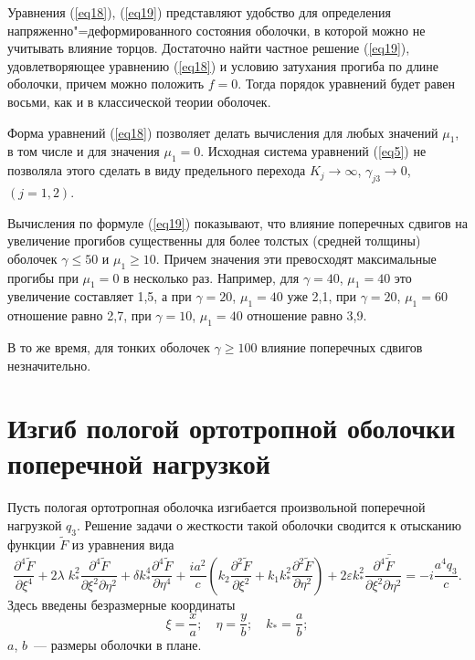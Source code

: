 \documentclass[press]{vestnik}
\begin{document}
Уравнения (\ref{eq18}), (\ref{eq19}) представляют удобство для определения 
напряженно"=деформированного состояния оболочки, в которой можно не учитывать 
влияние торцов. Достаточно найти частное решение (\ref{eq19}), удовлетворяющее 
уравнению (\ref{eq18}) и условию затухания прогиба по длине оболочки, причем можно 
положить $f=0$. Тогда порядок уравнений будет равен восьми, как и в 
классической теории оболочек.

Форма уравнений (\ref{eq18}) позволяет делать вычисления для любых значений $\mu 
_{1} $, в том числе и для значения $\mu_{1} =0$. Исходная система уравнений 
(\ref{eq5}) не позволяла этого сделать в виду предельного перехода $K_{j} \to 
\infty $, $\gamma_{j3} \to 0$, $\left( {j=1, 2} \right)$.

Вычисления по формуле (\ref{eq19}) показывают, что влияние поперечных сдвигов на 
увеличение прогибов существенны для более толстых (средней толщины) оболочек 
$\gamma \leqslant 50$ и $\mu_{1} \geqslant 10$. Причем значения эти превосходят 
максимальные прогибы при $\mu_{1} =0$ в несколько раз. Например, для 
$\gamma =40$, $\mu_{1} =40$ это увеличение составляет 1,5, а при $\gamma 
=20$, $\mu_{1} =40$ уже 2,1, при $\gamma =20$, $\mu_{1} =60$ отношение 
равно 2,7, при $\gamma =10$, $\mu_{1} =40$ отношение равно 3,9.

В то же время, для тонких оболочек $\gamma \geqslant 100$ влияние поперечных 
сдвигов незначительно.

\section{Изгиб пологой ортотропной оболочки поперечной нагрузкой}

Пусть пологая ортотропная оболочка изгибается произвольной поперечной 
нагрузкой $q_{3} $. Решение задачи о жесткости такой оболочки сводится к 
отысканию функции $\tilde{{F}}$ из уравнения вида~\cite{B11,B19,B20}
\begin{equation}
\label{eq21}
\frac{\partial^{4}\tilde{{F}}}{\partial \xi^{4}}+2\lambda \;k_{\ast }^{2} 
\frac{\partial^{4}\tilde{{F}}}{\partial \xi^{2}\partial \eta^{2}}+\delta k_{\ast }^{4} \frac{\partial^{4}\tilde{{F}}}{\partial \eta^{4}}+\frac{ia^{2}}{c}\left( {k_{2} \frac{\partial^{2}\tilde{{F}}}{\partial 
\xi^{2}}+k_{1} k_{\ast }^{2} \frac{\partial^{2}\tilde{{F}}}{\partial \eta^{2}}} \right)+2\varepsilon k_{\ast }^{2} \frac{\partial 
^{4}\bar{{\tilde{{F}}}}}{\partial \xi^{2}\partial \eta 
^{2}}=-i\frac{a^{4}q_{3} }{c}.
\end{equation}
Здесь введены безразмерные координаты
\[
\xi =\frac{x}{a};
\quad
\eta =\frac{y}{b};
\quad
k_{\ast } =\frac{a}{b};
\]
$a$, $b$~--- размеры оболочки в плане.
\end{document}
